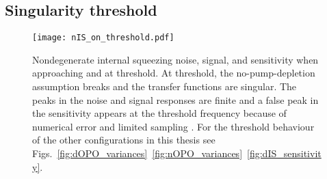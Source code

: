 
\subsection{Singularity threshold}
\label{sec:singularity_threshold}


\begin{figure}
    \centering
    \texttt{[image: nIS\_on\_threshold.pdf]}
    \caption{ Nondegenerate internal squeezing noise, signal, and sensitivity when approaching and at threshold. At threshold, the no-pump-depletion assumption breaks and the transfer functions are singular. The peaks in the noise and signal responses are finite and a false peak in the sensitivity appears at the threshold frequency because of numerical error and limited sampling . For the threshold behaviour of the other configurations in this thesis see Figs.~\ref{fig:dOPO_variances}~\ref{fig:nOPO_variances}~\ref{fig:dIS_sensitivity}.}
    \label{fig:nIS_on_threshold}
\end{figure}


